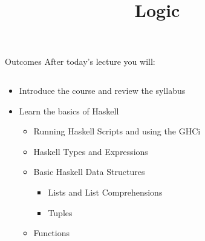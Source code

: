 \documentclass[11pt,t,pdf,xcolor=svgnames,aspectratio=169]{beamer}
\title{Logic}
\author{Dr.~Isaac Griffith \and }
\date{}
\institute{Idaho State University}
\providecommand{\tightlist}{%
  \setlength{\itemsep}{5pt}\setlength{\parskip}{0pt}}
\begin{document}
\maketitle


\begin{frame}{Outcomes}
\protect\hypertarget{outcomes}{}
After today's lecture you will:

\begin{columns}[T]
\begin{column}{.7\textwidth}
\begin{itemize}
\tightlist
\item
  Introduce the course and review the syllabus
\item
  Learn the basics of Haskell

  \begin{itemize}
  \tightlist
  \item
    Running Haskell Scripts and using the GHCi
  \item
    Haskell Types and Expressions
  \item
    Basic Haskell Data Structures

    \begin{itemize}
    \tightlist
    \item
      Lists and List Comprehensions
    \item
      Tuples
    \end{itemize}
  \item
    Functions
  \end{itemize}
\end{itemize}
\end{column}

\begin{column}{.25\textwidth}
\vfill
\vspace{5.75em}
\centering


\end{column}
\end{columns}
\end{frame}
\end{document}
